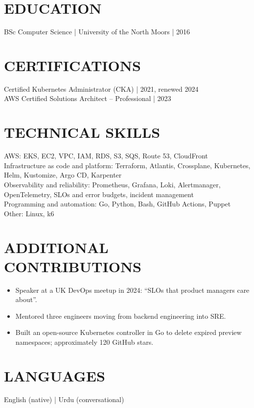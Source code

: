 \documentclass[11pt,a4paper]{article}
\begin{document}
\section*{EDUCATION}
BSc Computer Science | University of the North Moors | 2016
\section*{CERTIFICATIONS}
Certified Kubernetes Administrator (CKA) | 2021, renewed 2024\\
AWS Certified Solutions Architect – Professional | 2023
\section*{TECHNICAL SKILLS}
AWS: EKS, EC2, VPC, IAM, RDS, S3, SQS, Route 53, CloudFront\\
Infrastructure as code and platform: Terraform, Atlantis, Crossplane, Kubernetes, Helm, Kustomize, Argo CD, Karpenter\\
Observability and reliability: Prometheus, Grafana, Loki, Alertmanager, OpenTelemetry, SLOs and error budgets, incident management\\
Programming and automation: Go, Python, Bash, GitHub Actions, Puppet\\
Other: Linux, k6
\section*{ADDITIONAL CONTRIBUTIONS}
\begin{itemize}
\item Speaker at a UK DevOps meetup in 2024: “SLOs that product managers care about”.
\item Mentored three engineers moving from backend engineering into SRE.
\item Built an open-source Kubernetes controller in Go to delete expired preview namespaces; approximately 120 GitHub stars.
\end{itemize}
\section*{LANGUAGES}
English (native) | Urdu (conversational)
\end{document}
